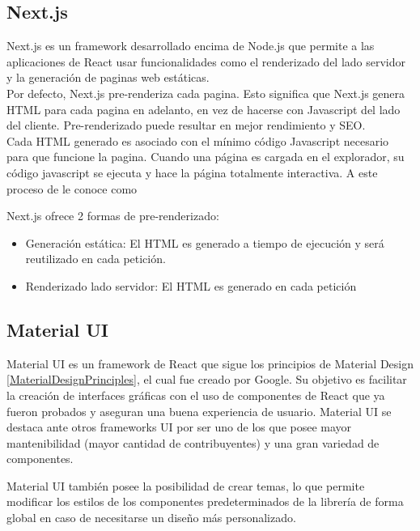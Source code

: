 \subsection{Next.js}

Next.js es un framework desarrollado encima de Node.js que permite a las aplicaciones de React usar funcionalidades como el renderizado del lado servidor y la generación de paginas web estáticas.\\

Por defecto, Next.js pre-renderiza cada pagina. Esto significa que Next.js genera HTML para cada pagina en adelanto, en vez de hacerse con Javascript del lado del cliente. Pre-renderizado puede resultar en mejor rendimiento y SEO.\\

Cada HTML generado es asociado con el mínimo código Javascript necesario para que funcione la pagina. Cuando una página es cargada en el explorador, su código javascript se ejecuta y hace la página totalmente interactiva. A este proceso de le conoce como 

Next.js ofrece 2 formas de pre-renderizado:

\begin{itemize}
    \item Generación estática: El HTML es generado a tiempo de ejecución y será reutilizado en cada petición.
    \item Renderizado lado servidor: El HTML es generado en cada petición
\end{itemize}

\subsection{Material UI}

Material UI es un framework de React que sigue los principios de Material Design \ref*{MaterialDesignPrinciples}, el cual fue creado por Google. Su objetivo es facilitar la creación de interfaces gráficas con el uso de componentes de React que ya fueron probados y aseguran una buena experiencia de usuario. Material UI se destaca ante otros frameworks UI por ser uno de los que posee mayor mantenibilidad (mayor cantidad de contribuyentes) y una gran variedad de componentes.

Material UI también posee la posibilidad de crear temas, lo que permite modificar los estilos de los componentes predeterminados de la librería de forma global en caso de necesitarse un diseño más personalizado.

